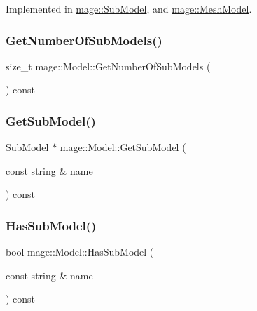 Implemented in \hyperlink{classmage_1_1_sub_model_a368bcc2ee819cc29ec0203e314ae91d3}{mage\+::\+Sub\+Model}, and \hyperlink{classmage_1_1_mesh_model_a7130eca9a1dac038c33b838c15138161}{mage\+::\+Mesh\+Model}.

\hypertarget{classmage_1_1_model_a29ad2496b11ef5af5f179cfe52943cd3}{}\label{classmage_1_1_model_a29ad2496b11ef5af5f179cfe52943cd3} 
\subsubsection{\texorpdfstring{Get\+Number\+Of\+Sub\+Models()}{GetNumberOfSubModels()}}
{\footnotesize\ttfamily size\+\_\+t mage\+::\+Model\+::\+Get\+Number\+Of\+Sub\+Models (\begin{DoxyParamCaption}{ }\end{DoxyParamCaption}) const}

\hypertarget{classmage_1_1_model_a1cae9eb62a353445d14b5331e88bdeac}{}\label{classmage_1_1_model_a1cae9eb62a353445d14b5331e88bdeac} 
\subsubsection{\texorpdfstring{Get\+Sub\+Model()}{GetSubModel()}}
{\footnotesize\ttfamily \hyperlink{classmage_1_1_sub_model}{Sub\+Model} $\ast$ mage\+::\+Model\+::\+Get\+Sub\+Model (\begin{DoxyParamCaption}\item[{const string \&}]{name }\end{DoxyParamCaption}) const}

\hypertarget{classmage_1_1_model_a319fb9b9d9c673ed9c83325d5bcbdfd7}{}\label{classmage_1_1_model_a319fb9b9d9c673ed9c83325d5bcbdfd7} 
\subsubsection{\texorpdfstring{Has\+Sub\+Model()}{HasSubModel()}}
{\footnotesize\ttfamily bool mage\+::\+Model\+::\+Has\+Sub\+Model (\begin{DoxyParamCaption}\item[{const string \&}]{name }\end{DoxyParamCaption}) const}

